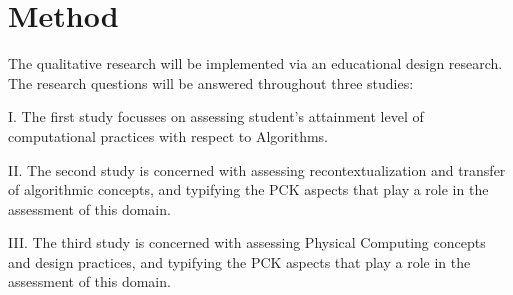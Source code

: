 \section{Method}\label{sec:method}

The qualitative research will be implemented via an educational design research. The research questions will be answered throughout three studies:
%
%

\vspace{3mm}

I. The first study focusses on assessing student's attainment level of computational practices with respect to Algorithms.

II. The second study is concerned with assessing recontextualization and transfer of algorithmic concepts, and typifying the PCK aspects that play a role in the assessment of this domain.

III. The third study is concerned with assessing Physical Computing concepts and design practices, and typifying the PCK aspects that play a role in the assessment of this domain. \newline




%

%
%
%


